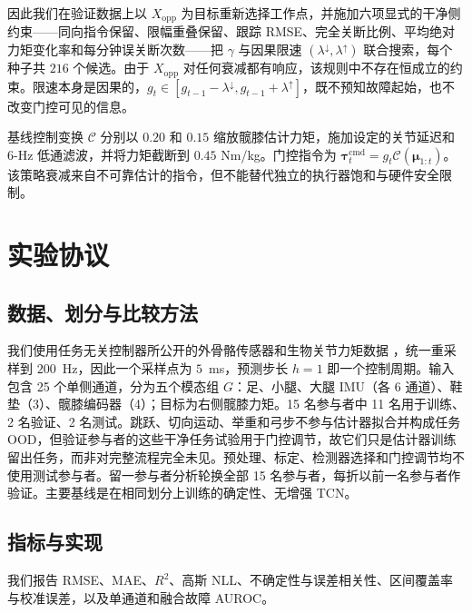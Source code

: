 \documentclass[UTF8]{ctexart}
\begin{document}
因此我们在验证数据上以 $X_{\mathrm{opp}}$ 为目标重新选择工作点，并施加六项显式的干净侧约束——同向指令保留、限幅重叠保留、跟踪 RMSE、完全关断比例、平均绝对力矩变化率和每分钟误关断次数——把 $\gamma$ 与因果限速 $(\lambda^{\downarrow},\lambda^{\uparrow})$ 联合搜索，每个种子共 $216$ 个候选。由于 $X_{\mathrm{opp}}$ 对任何衰减都有响应，该规则中不存在恒成立的约束。限速本身是因果的，$g_t\in[g_{t-1}-\lambda^{\downarrow},g_{t-1}+\lambda^{\uparrow}]$，既不预知故障起始，也不改变门控可见的信息。

基线控制变换 $\mathcal{C}$ 分别以 $0.20$ 和 $0.15$ 缩放髋膝估计力矩，施加设定的关节延迟和 6-Hz 低通滤波，并将力矩截断到 $0.45$ Nm/kg。门控指令为 $\boldsymbol{\tau}^{\mathrm{cmd}}_t=g_t\mathcal{C}(\boldsymbol{\mu}_{1:t})$。该策略衰减来自不可靠估计的指令，但不能替代独立的执行器饱和与硬件安全限制。

\section{实验协议}

\subsection{数据、划分与比较方法}

我们使用任务无关控制器所公开的外骨骼传感器和生物关节力矩数据 \citep{molinaro2024task,scherpereel2023dataset}，统一重采样到 $200$~Hz，因此一个采样点为 $5$~ms，预测步长 $h=1$ 即一个控制周期。输入包含 25 个单侧通道，分为五个模态组 $G$：足、小腿、大腿 IMU（各 6 通道）、鞋垫（3）、髋膝编码器（4）；目标为右侧髋膝力矩。15 名参与者中 11 名用于训练、2 名验证、2 名测试。跳跃、切向运动、举重和弓步不参与估计器拟合并构成任务 OOD，但验证参与者的这些干净任务试验用于门控调节，故它们只是估计器训练留出任务，而非对完整流程完全未见。预处理、标定、检测器选择和门控调节均不使用测试参与者。留一参与者分析轮换全部 15 名参与者，每折以前一名参与者作验证。主要基线是在相同划分上训练的确定性、无增强 TCN。

\subsection{指标与实现}

我们报告 RMSE、MAE、$R^2$、高斯 NLL、不确定性与误差相关性、区间覆盖率与校准误差，以及单通道和融合故障 AUROC。
\end{document}
